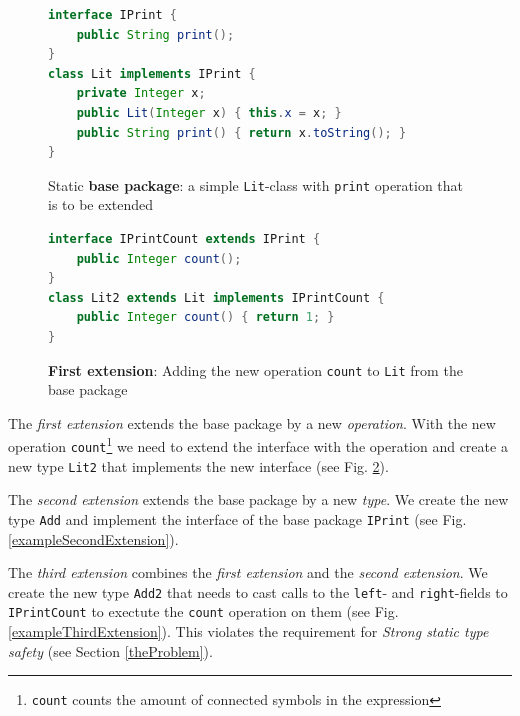 \documentclass{report}
\begin{document}
\begin{figure}[H]
\vspace{-10pt}
\begin{lstlisting}[language=java]
interface IPrint {
    public String print();
}
class Lit implements IPrint {
    private Integer x;
    public Lit(Integer x) { this.x = x; }
    public String print() { return x.toString(); }
}
\end{lstlisting}
\caption{Static \textbf{base package}: a simple \lstinline{Lit}-class with \lstinline{print} operation that is to be extended}
\label{exampleLitBaseClass}
\end{figure}
\begin{figure}[H]
\vspace{-10pt}
\begin{lstlisting}[language=java]
interface IPrintCount extends IPrint {
    public Integer count();
}
class Lit2 extends Lit implements IPrintCount {
    public Integer count() { return 1; }
}
\end{lstlisting}
\caption{\textbf{First extension}: Adding the new operation \lstinline{count} to \lstinline{Lit} from the base package}
\label{exampleFirstExtension}
\end{figure}

The \emph{first extension} extends the base package by a new \emph{operation}. With the new operation \lstinline{count}\footnote{\lstinline{count} counts the amount of connected symbols in the expression} we need to extend the interface with the operation and create a new type \lstinline{Lit2} that implements the new interface (see Fig. \ref{exampleFirstExtension}).

The \emph{second extension} extends the base package by a new \emph{type}. We create the new type \lstinline{Add} and implement the interface of the base package \lstinline{IPrint} (see Fig. \ref{exampleSecondExtension}).

The \emph{third extension} combines the \emph{first extension} and the \emph{second extension}. We create the new type \lstinline{Add2} that needs to cast calls to the \lstinline{left}- and \lstinline{right}-fields to \lstinline{IPrintCount} to exectute the \lstinline{count} operation on them (see Fig. \ref{exampleThirdExtension}). This violates the requirement for \emph{Strong static type safety} (see Section \ref{theProblem}).
\end{document}
